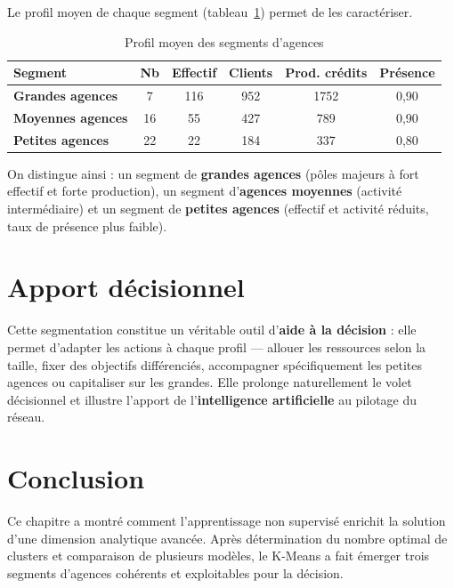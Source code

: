 Le profil moyen de chaque segment (tableau~\ref{tab:profils_clusters}) permet de
les caractériser.

\begin{table}[htbp]
\centering
\caption{Profil moyen des segments d'agences}
\label{tab:profils_clusters}
\renewcommand{\arraystretch}{1.25}
\begin{tabularx}{\textwidth}{>{\bfseries}Xccccc}
\toprule
\textmd{\textbf{Segment}} & \textbf{Nb} & \textbf{Effectif} & \textbf{Clients} &
\textbf{Prod. crédits} & \textbf{Présence}\\
\midrule
Grandes agences   & 7  & 116 & 952 & 1752 & 0,90\\
Moyennes agences  & 16 & 55  & 427 & 789  & 0,90\\
Petites agences   & 22 & 22  & 184 & 337  & 0,80\\
\bottomrule
\end{tabularx}
\end{table}

On distingue ainsi : un segment de \textbf{grandes agences} (pôles majeurs à fort
effectif et forte production), un segment d'\textbf{agences moyennes} (activité
intermédiaire) et un segment de \textbf{petites agences} (effectif et activité
réduits, taux de présence plus faible).

\section{Apport décisionnel}
Cette segmentation constitue un véritable outil d'\textbf{aide à la décision} :
elle permet d'adapter les actions à chaque profil --- allouer les ressources selon
la taille, fixer des objectifs différenciés, accompagner spécifiquement les
petites agences ou capitaliser sur les grandes. Elle prolonge naturellement le
volet décisionnel et illustre l'apport de l'\textbf{intelligence artificielle} au
pilotage du réseau.

\section*{Conclusion}
Ce chapitre a montré comment l'apprentissage non supervisé enrichit la solution
d'une dimension analytique avancée. Après détermination du nombre optimal de
clusters et comparaison de plusieurs modèles, le K-Means a fait émerger trois
segments d'agences cohérents et exploitables pour la décision.
